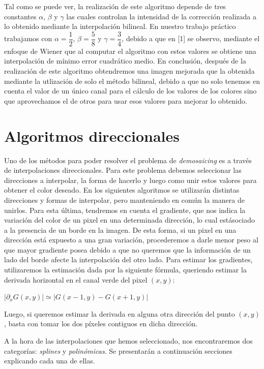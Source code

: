 \documentclass[10pt, a4paper]{article}
\begin{document}
Tal como se puede ver, la realizaci\'on de este algoritmo depende de tres constantes $\alpha$, $\beta$ y $\gamma$ las cuales controlan la intensidad de la correcci\'on realizada a lo obtenido mediante la interpolaci\'on bilineal. En nuestro trabajo pr\'actico trabajamos con $\alpha=\dfrac{1}{2}$, $\beta=\dfrac{5}{8}$ y $\gamma=\dfrac{3}{4}$, debido a que en [1] se observo, mediante el enfoque de Wiener que al computar el algoritmo con estos valores se obtiene una interpolación de mínimo error cuadrático medio.
En conclusi\'on, despu\'es de la realizaci\'on de este algoritmo obtendremos una imagen mejorada que la obtenida mediante la utlizaci\'on de solo el m\'etodo bilineal, debido a que no solo tenemos en cuenta el valor de un \'unico canal para el c\'alculo de los valores de los colores sino que aprovechamos el de otros para usar esos valores para mejorar lo obtenido.

\section{Algoritmos direccionales}


Uno de los m\'etodos para poder resolver el problema de \textit{demosaicing} es a trav\'es de interpolaciones direccionales. Para este problema debemos seleccionar las direcciones a interpolar, la forma de hacerlo y luego como unir estos valores para obtener el color deseado. En los siguientes algoritmos se utilizar\'an distintas direcciones y formas de interpolar, pero manteniendo en com\'un la manera de unirlos. Para esta \'ultima, tendremos en cuenta el gradiente, que nos indica la variaci\'on del color de un pixel en una determinada direcci\'on, lo cual est\' asociado a la presencia de un borde en la imagen. De esta forma, si un pixel en una direcci\'on est\'a expuesto a una gran variaci\'on, procederemos a darle menor peso al que mayor gradiente posea debido a que no queremos que la informaci\'on de un lado del borde afecte la interpolaci\'on del otro lado. Para estimar los gradientes, utilizaremos la estimaci\'on dada por la siguiente f\'ormula, queriendo estimar la derivada horizontal en el canal verde del pixel $(x,y)$:
\begin{center} 
$|\partial_{x}G(x,y)| \simeq |G(x-1,y)-G(x+1,y)|$
\end{center}
Luego, si queremos estimar la derivada en alguna otra direcci\'on del punto $(x,y)$, basta con tomar los dos p\'ixeles contiguos en dicha direcci\'on. 

A la hora de las interpolaciones que hemos seleccionado, nos encontraremos dos categor\'ias: \textit{splines} y \textit{polin\'omicas}. Se presentar\'an a continuaci\'on secciones explicando cada una de ellas.
\end{document}
